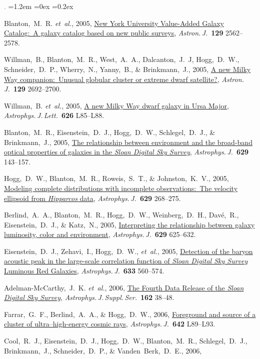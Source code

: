 \documentclass[10pt,letterpaper]{article}
\newcommand{\foreign}[1]{\textsl{#1}}
\newcommand{\etal}{\foreign{et~al.}}
\newcommand{\project}[1]{\textsl{#1}}
\newcommand{\doi}[2]{\href{http://dx.doi.org/#1}{{#2}}}
\newcommand{\deemph}[1]{\textcolor{grey}{\footnotesize{#1}}}
\newcommand{\pubnumber}[1]{\deemph{{#1}.}}
\newcounter{refpubnum}
\newcommand{\hogglist}{%
    \rightmargin=0in
    \leftmargin=1.2em
    \topsep=0ex
    \partopsep=0pt
    \itemsep=0.2ex
    \parsep=0pt
    \itemindent=-1.0\leftmargin
    \listparindent=0.0\leftmargin
    \settowidth{\labelsep}{~}
    \usecounter{refpubnum}
  }
\begin{document}
\begin{list}{\pubnumber{\therefpubnum}}{\hogglist}
\item
Blanton,~M.~R. \etal, 2005,
\doi{10.1086/429803}{New York University Value-Added Galaxy Catalog:\ A galaxy catalog based on new public surveys},
\textit{Astron.\,J.}\ \textbf{129} 2562--2578.
\item
Willman,~B., Blanton,~M.~R., West,~A.~A., Dalcanton,~J.~J, Hogg,~D.~W., Schneider,~D.~P., Wherry,~N., Yanny,~B., \& Brinkmann,~J., 2005,
\doi{10.1086/430214}{A new Milky Way companion:\ Unusual globular cluster or extreme dwarf satellite?},
\textit{Astron.\,J.}\ \textbf{129} 2692--2700.
\item\label{pub:Willman2005b}
Willman,~B. \etal, 2005,
\doi{10.1086/431760}{A new Milky Way dwarf galaxy in Ursa Major},
\textit{Astrophys.\,J.\,Lett.}\ \textbf{626} L85--L88.
\item
Blanton,~M.~R., Eisenstein,~D.~J., Hogg,~D.~W., Schlegel,~D.~J., \& Brinkmann,~J., 2005,
\doi{10.1086/422897}{The relationship between environment and the broad-band optical properties of galaxies in the \project{Sloan Digital Sky Survey}},
\textit{Astrophys.\,J.}\ \textbf{629} 143--157.
\item
Hogg,~D.~W., Blanton,~M.~R., Roweis,~S.~T., \& Johnston,~K.~V., 2005,
\doi{10.1086/431572}{Modeling complete distributions with incomplete observations:\ The velocity ellipsoid from \project{Hipparcos} data},
\textit{Astrophys.\,J.}\ \textbf{629} 268--275.
\item
Berlind,~A.~A., Blanton,~M.~R., Hogg,~D.~W., Weinberg,~D.~H., Dav\'e,~R., Eisenstein,~D.~J., \& Katz,~N., 2005,
\doi{10.1086/431658}{Interpreting the relationship between galaxy luminosity, color and environment},
\textit{Astrophys.\,J.}\ \textbf{629} 625--632.
\item\label{pub:Eisenstein2005}
Eisenstein,~D.~J., Zehavi,~I., Hogg,~D.~W., \etal, 2005,
\doi{10.1086/466512}{Detection of the baryon acoustic peak in the large-scale correlation function of \project{Sloan Digital Sky Survey} Luminous Red Galaxies},
\textit{Astrophys.\,J.}\ \textbf{633} 560--574.
\item
Adelman-McCarthy,~J.~K. \etal, 2006,
\doi{10.1086/497917}{The Fourth Data Release of the \project{Sloan Digital Sky Survey}},
\textit{Astrophys.\,J.\,Suppl.\,Ser.}\ \textbf{162} 38--48.
\item
Farrar,~G.~F., Berlind,~A.~A., \& Hogg,~D.~W., 2006,
\doi{10.1086/504711}{Foreground and source of a cluster of ultra--high-energy cosmic rays},
\textit{Astrophys.\,J.}\ \textbf{642} L89--L93.
\item
Cool,~R.~J., Eisenstein,~D.~J., Hogg,~D.~W., Blanton,~M.~R., Schlegel,~D.~J., Brinkmann,~J., Schneider,~D.~P., \& Vanden~Berk,~D.~E., 2006,

\end{list}
\end{document}
